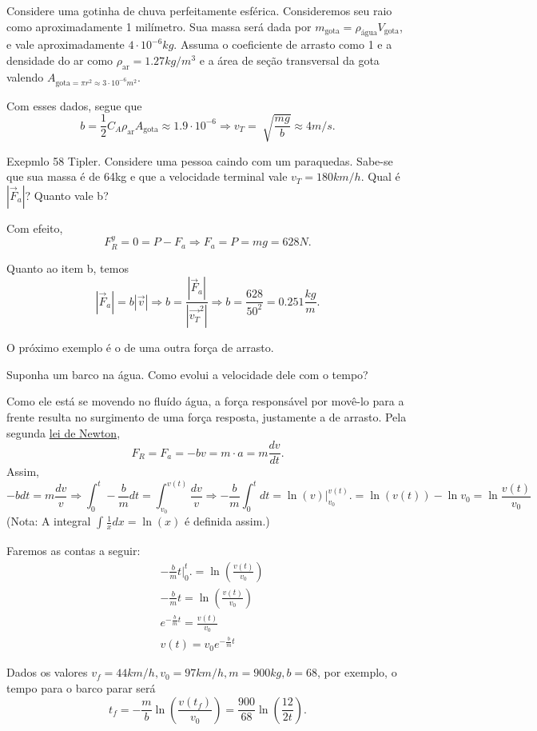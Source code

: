 \documentclass[physics_notes.tex]{subfiles}
\begin{document}
\begin{example}
	Considere uma gotinha de chuva perfeitamente esférica. Consideremos seu raio como aproximadamente 1 milímetro.
	Sua massa será dada por \(m_{\text{gota}}=\rho_{\text{água}}V_{\text{gota}}\), e vale aproximadamente \(4 \cdot 10^{-6}kg\). Assuma o coeficiente de arrasto como
	1 e a densidade do ar como \(\rho_{\text{ar}}=1.27kg/m^3\) e a área de seção transversal da gota valendo \(A_{\text{gota}=\pi r^2\approx3 \cdot 10^{-6}m^2}\).

	Com esses dados, segue que
	\[
		b = \frac{1}{2}C_{A}\rho_{\text{ar}}A_{\text{gota}}\approx 1.9 \cdot 10^{-6} \Rightarrow v_{T} = \sqrt[]{\frac{mg}{b}}\approx 4m/s.
	\]
\end{example}
\begin{example}
	Exepmlo 58 Tipler. Considere uma pessoa caindo com um paraquedas. Sabe-se que sua massa é de 64kg e que a velocidade terminal vale \(v_{T}=180km/h\). Qual é
	\(|\vec{F}_{a}|\)? Quanto vale b?

	Com efeito,
	\[
		F_{R}^{y} = 0 = P-F_{a} \Rightarrow F_{a} = P = mg = 628N.
	\]

	Quanto ao item  b, temos
	\[
		|\vec{F}_{a}| = b |\vec{v}| \Rightarrow  b = \frac{|\vec{F}_{a}|}{|\vec{v_{T}}^2|} \Rightarrow b = \frac{628}{50^2} = 0.251 \frac{kg}{m}.
	\]
\end{example}
O próximo exemplo é o de uma outra força de arrasto.
\begin{example}
	Suponha um barco na água. Como evolui a velocidade dele com o tempo?

	Como ele está se movendo no fluído água, a força responsável por movê-lo para
	a frente resulta no surgimento de uma força resposta, justamente a de arrasto.
	Pela segunda \hyperlink{second_newton}{lei de Newton},
	\[
		F_{R} = F_{a} = -bv = m \cdot a = m \frac{dv}{dt}.
	\]
	Assim,
	\[
		-b dt = m \frac{dv}{v} \Rightarrow \int_{0}^{t}-\frac{b}{m}dt = \int_{v_{0}}^{v(t)}\frac{dv}{v}
		\Rightarrow -\frac{b}{m}\int_{0}^{t}dt = \ln{(v)}\biggl|_{v_{0}}^{v(t)}\biggr. = \ln{(v(t))} - \ln{v_{0}} = \ln{\frac{v(t)}{v_{0}}}
	\]
	(Nota: A integral \(\int_{}^{}\frac{1}{x}dx = \ln{(x)}\) é definida assim.)

	Faremos as contas a seguir:
	\begin{align*}
		 & -\frac{b}{m}t \biggl|_{0}^{t}\biggr. = \ln{(\frac{v(t)}{v_{0}})} \\
		 & -\frac{b}{m}t = \ln{(\frac{v(t)}{v_{0}})}                        \\
		 & e^{-\frac{b}{m}t} = \frac{v(t)}{v_{0}}                           \\
		 & v(t) = v_{0}e^{-\frac{b}{m}t}
	\end{align*}

	Dados os valores \(v_{f}=44km/h, v_{0} = 97km/h, m=900kg, b=68\), por exemplo,
	o tempo para o barco parar será
	\[
		t_{f} = -\frac{m}{b}\ln{(\frac{v(t_{f})}{v_{0}})} = \frac{900}{68}\ln{(\frac{12}{2t})}.
	\]
\end{example}
\end{document}
